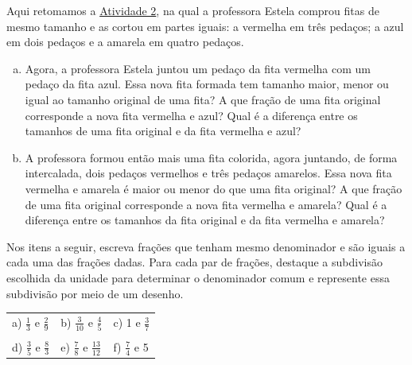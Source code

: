 \begin{atividade}{}

Aqui retomamos a \hyperref[chap5-ativ2]{Atividade 2}, na qual a professora Estela comprou fitas de mesmo tamanho e as cortou em partes iguais: a vermelha em três pedaços; a azul em dois pedaços e a amarela em quatro pedaços.

\begin{center}
\end{center}

\begin{enumerate}[a)]
  \item  Agora, a professora Estela juntou um pedaço da fita vermelha com um pedaço da fita azul. Essa nova fita formada tem tamanho maior, menor ou igual ao tamanho original de uma fita? A que fração de uma fita original corresponde a nova fita vermelha e azul? Qual é a diferença entre os tamanhos de uma fita original e da fita vermelha e azul?
  \item  A professora formou então mais uma fita colorida, agora juntando, de forma intercalada, dois pedaços vermelhos e três pedaços amarelos. Essa nova fita vermelha e amarela é maior ou menor do que uma fita original? A que fração de uma fita original corresponde a nova fita vermelha e amarela? Qual é a diferença entre os tamanhos da fita original e da fita vermelha e amarela?
\end{enumerate}

\end{atividade}

\begin{atividade}{}


Nos itens a seguir, escreva frações que tenham mesmo denominador e são iguais a cada uma das frações dadas.
Para cada par de frações, destaque a subdivisão escolhida da unidade para determinar o denominador comum e represente essa subdivisão por meio de um desenho.

\begin{center}
  \begin{tabular}{m{}m{}m{}}

     a) $\frac{1}{3}$ e $\frac{2}{9}$  &   b) $\frac{3}{10}$ e $\frac{4}{5}$  &   c) 1 e $\frac{3}{7}$  \\
     \\
     d) $\frac{3}{5}$ e $\frac{8}{3}$  &   e) $\frac{7}{8}$ e $\frac{13}{12}$  &  f) $\frac{7}{4}$ e 5
  \end{tabular}
\end{center}
\end{atividade}

